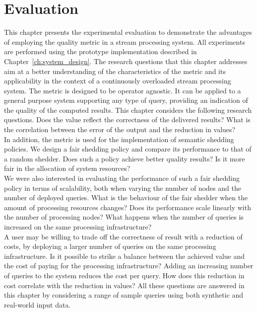 \chapter{Evaluation}
\label{ch:evaluation}

This chapter presents the experimental evaluation to demonstrate the advantages of employing the \sic
quality metric in a stream processing system. All experiments are performed using the \sys prototype
implementation described in Chapter~\ref{ch:system_design}.
The research questions that this chapter addresses aim at a better understanding of the characteristics
of the \sic metric and its applicability in the context of a continuously overloaded stream
processing system.
The \sic metric is designed to be operator agnostic. It can be applied to a general purpose
system supporting any type of query, providing an indication of the quality of the
computed results. This chapter considers the following research questions. Does the \sic value reflect
the correctness of the delivered results? 
What is the correlation between the error of the output and the reduction in \sic values?\\
In addition, the \sic metric is used for the implementation of semantic shedding policies.
We design a fair shedding policy and compare its performance to that of a random
shedder.
Does such a policy achieve better quality results? Is it more fair in the allocation of system
resources?\\
We were also interested in evaluating the performance of such a fair shedding policy in terms of
scalability, both when varying the number of nodes and the number of deployed queries.
What is the behaviour of the fair shedder when the amount of processing resources
changes? Does its performance scale linearly with the number of processing nodes? What happens when the
number of queries is increased on the same processing infrastructure? \\
A user may be willing to trade off the correctness of result with a reduction of costs, \eg by
deploying a larger number of queries on the same processing infrastructure. 
Is it possible to strike a balance between the achieved \sic value and the cost of paying for the
processing infrastructure? Adding an increasing number of queries to the system reduces the cost per
query.
How does this reduction in cost correlate with the reduction in \sic values? All these questions are
answered in this chapter by considering a range of sample queries using both synthetic and real-world
input data.


  







%



